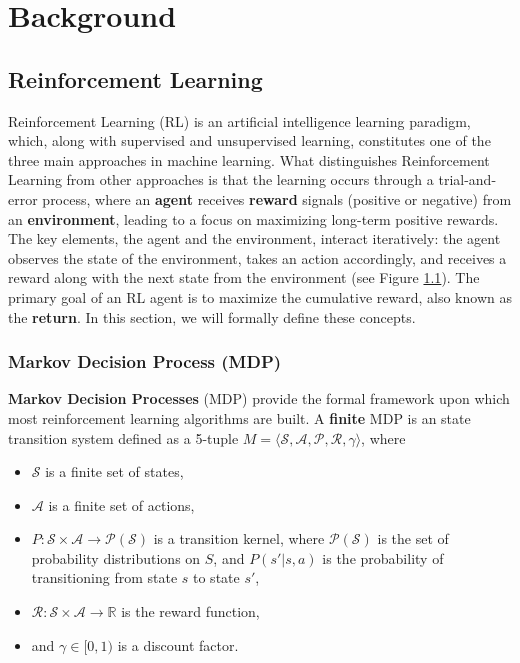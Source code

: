 
\chapter{Background}

\section{Reinforcement Learning}

Reinforcement Learning (RL) \cite{sutton2018reinforcement} is an artificial intelligence learning paradigm, which, along with supervised and unsupervised learning, constitutes one of the three main approaches in machine learning. What distinguishes Reinforcement Learning from other approaches is that the learning occurs through a trial-and-error process, where an \textbf{agent} receives \textbf{reward} signals (positive or negative) from an \textbf{environment}, leading to a focus on maximizing long-term positive rewards. The key elements, the agent and the environment, interact iteratively: the agent observes the state of the environment, takes an action accordingly, and receives a reward along with the next state from the environment (see Figure \ref{}). The primary goal of an RL agent is to maximize the cumulative reward, also known as the \textbf{return}. In this section, we will formally define these concepts.

\subsection{Markov Decision Process (MDP)}
\label{sec:mdp_definition}

\textbf{Markov Decision Processes} (MDP) provide the formal framework upon which most reinforcement learning algorithms are built. A \textbf{finite} MDP is an state transition system defined as a 5-tuple $M = \langle \mathcal{S}, \mathcal{A}, \mathcal{P}, \mathcal{R}, \gamma \rangle$, where 

\begin{itemize}
    \item $\mathcal{S}$ is a finite set of states,
    \item $\mathcal{A}$ is a finite set of actions,
    \item $P : \mathcal{S} \times \mathcal{A} \rightarrow \mathcal{P(S)}$ is a transition kernel, where $\mathcal{P(S)}$ is the set of probability distributions on $S$, and $P(s'|s, a)$ is the probability of transitioning from state $s$ to state $s'$,
    \item $\mathcal{R} : \mathcal{S} \times \mathcal{A}  \rightarrow \mathbb{R}$ is the reward function,
    \item and $\gamma \in [0, 1)$ is a discount factor.
\end{itemize}

